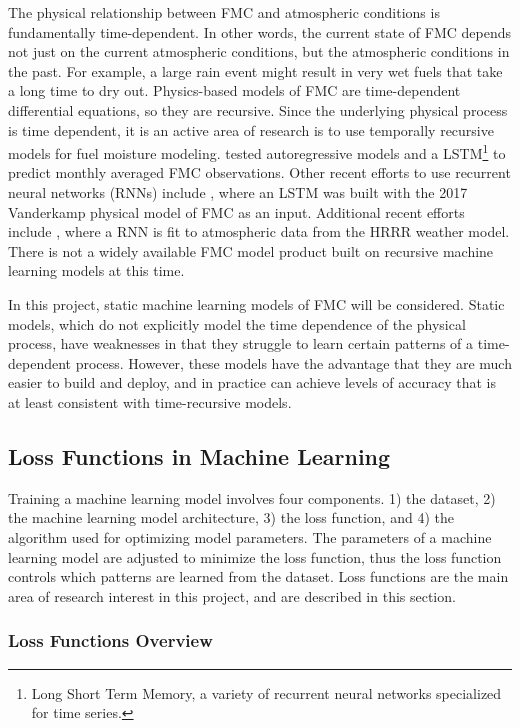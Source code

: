 \documentclass[11pt]{article}%
\begin{document}
The physical relationship between FMC and atmospheric conditions is fundamentally time-dependent. In other words, the current state of FMC depends not just on the current atmospheric conditions, but the atmospheric conditions in the past. For example, a large rain event might result in very wet fuels that take a long time to dry out. Physics-based models of FMC are time-dependent differential equations, so they are recursive. Since the underlying physical process is time dependent, it is an active area of research is to use temporally recursive models for fuel moisture modeling. \cite{Kang-2022-FMC} tested autoregressive models and a LSTM\footnote{Long Short Term Memory, a variety of recurrent neural networks specialized for time series.} to predict monthly averaged FMC observations. Other recent efforts to use recurrent neural networks (RNNs) include \cite{Fan-2021-PGD}, where an LSTM was built with the 2017 Vanderkamp physical model of FMC as an input. Additional recent efforts include \cite{Mandel-2023-BFM}, where a RNN is fit to atmospheric data from the HRRR weather model. There is not a widely available FMC model product built on recursive machine learning models at this time.

In this project, static machine learning models of FMC will be considered. Static models, which do not explicitly model the time dependence of the physical process, have weaknesses in that they struggle to learn certain patterns of a time-dependent process. However, these models have the advantage that they are much easier to build and deploy, and in practice can achieve levels of accuracy that is at least consistent with time-recursive models.

\subsection{Loss Functions in Machine Learning}

Training a machine learning model involves four components. 1) the dataset, 2) the machine learning model architecture, 3) the loss function, and 4) the algorithm used for optimizing model parameters. The parameters of a machine learning model are adjusted to minimize the loss function, thus the loss function controls which patterns are learned from the dataset. Loss functions are the main area of research interest in this project, and are described in this section.

\subsubsection{Loss Functions Overview}
\hfill
\end{document}

